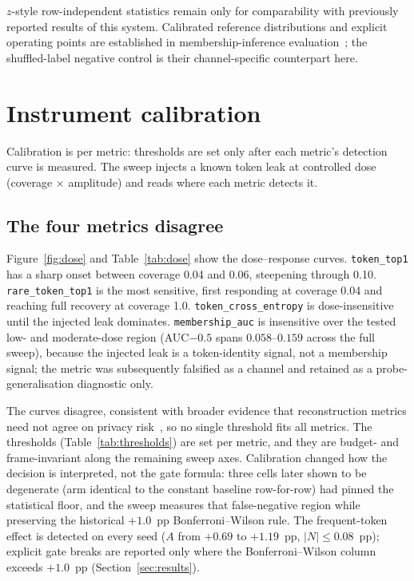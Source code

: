 \documentclass[11pt]{article}
\newcommand{\pp}{pp}
\begin{document}
$z$-style row-independent statistics remain
only for comparability with previously reported results of this system. Calibrated reference
distributions and explicit operating points are established in
membership-inference evaluation~\cite{carlini2022lira,song2021systematic}; the
shuffled-label negative control is their channel-specific counterpart here.

\section{Instrument calibration}
\label{sec:calibration}

Calibration is per metric: thresholds are set only after each metric's
detection curve is measured. The sweep injects a known token leak at controlled
dose (coverage $\times$ amplitude) and reads where each metric detects it.

\subsection{The four metrics disagree}

Figure~\ref{fig:dose} and Table~\ref{tab:dose} show the dose--response curves.
\texttt{token\_top1} has a sharp onset between coverage 0.04 and 0.06, steepening
through 0.10. \texttt{rare\_token\_top1} is the most sensitive, first responding
at coverage 0.04 and reaching full recovery at coverage 1.0.
\texttt{token\_cross\_entropy} is dose-insensitive until the injected leak
dominates. \texttt{membership\_auc} is insensitive over the tested low- and
moderate-dose region (AUC$-0.5$ spans
$0.058$--$0.159$ across the full sweep), because the injected leak is a
token-identity signal, not a membership signal; the metric was subsequently
falsified as a channel and retained as a probe-generalisation diagnostic only.

The curves disagree, consistent with broader evidence that reconstruction
metrics need not agree on privacy risk~\cite{sun2023metrics}, so no single
threshold fits all metrics. The thresholds (Table~\ref{tab:thresholds}) are set per metric, and they are budget-
and frame-invariant along the remaining sweep axes. Calibration changed how the
decision is interpreted, not the gate formula: three cells later shown to be
degenerate (arm identical to the constant baseline row-for-row) had pinned the
statistical floor, and the sweep measures that false-negative region while
preserving the historical $+1.0$~\pp{} Bonferroni--Wilson rule. The frequent-token
effect is detected on every seed ($A$ from $+0.69$ to $+1.19$~\pp{}, $|N|\le
0.08$~\pp{}); explicit gate breaks are reported only where the
Bonferroni--Wilson column exceeds $+1.0$~\pp{} (Section~\ref{sec:results}).
\end{document}
